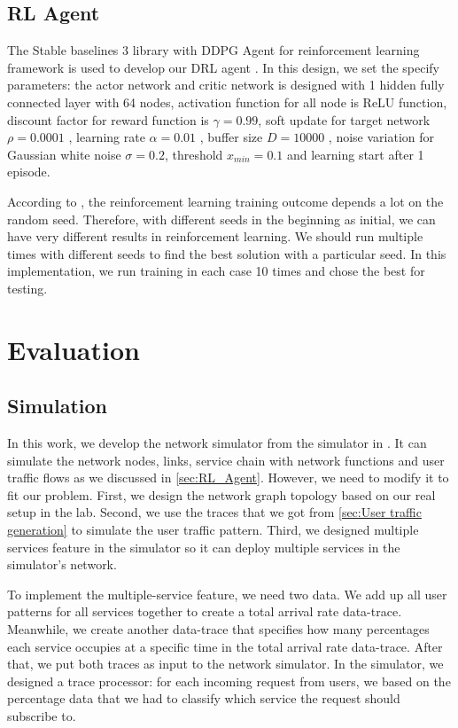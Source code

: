 \documentclass[conference]{IEEEtran}
\begin{document}
\subsection{RL Agent}
The Stable baselines 3 library with DDPG Agent for reinforcement learning framework is used to develop our DRL agent \cite{stable-baselines3}. In this design, we set the specify parameters: the actor network and critic network is designed with 1 hidden fully connected layer with 64 nodes, activation function for all node is ReLU function, discount factor for reward function is $\gamma = 0.99$, soft update for target network $\rho = 0.0001$ , learning rate $\alpha = 0.01$ , buffer size $D = 10000$ , noise variation for Gaussian white noise $\sigma = 0.2$, threshold $x_{min} = 0.1$ and learning start after 1 episode.

According to \cite{rlblogpost}, the reinforcement learning training outcome depends a lot on the random seed. Therefore, with different seeds in the beginning as initial, we can have very different results in reinforcement learning. We should run multiple times with different seeds to find the best solution with a particular seed. In this implementation, we run training in each case 10 times and chose the best for testing. 

\section{Evaluation}
\label{sec:Evaluation}
\subsection{Simulation}
In this work, we develop the network simulator from the simulator in \cite{9269087}. It can simulate the network nodes, links, service chain with network functions and user traffic flows as we discussed in \ref{sec:RL_Agent}. However, we need to modify it to fit our problem. First, we design the network graph topology based on our real setup in the lab. Second, we use the traces that we got from \ref{sec:User traffic generation} to simulate the user traffic pattern. Third, we designed multiple services feature in the simulator so it can deploy multiple services in the simulator's network. 

To implement the multiple-service feature, we need two data. We add up all user patterns for all services together to create a total arrival rate data-trace. Meanwhile, we create another data-trace that specifies how many percentages each service occupies at a specific time in the total arrival rate data-trace. After that, we put both traces as input to the network simulator. In the simulator, we designed a trace processor: for each incoming request from users, we based on the percentage data that we had to classify which service the request should subscribe to.
\end{document}

